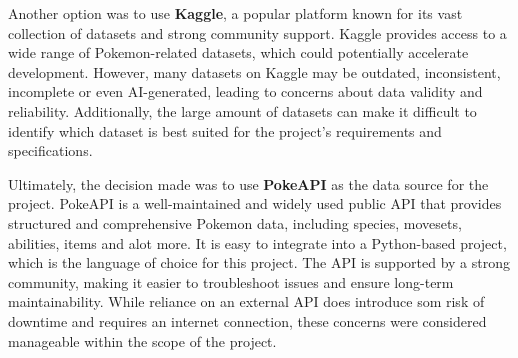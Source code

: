 Another option was to use \textbf{Kaggle}, a popular platform known for its vast collection
of datasets and strong community support. Kaggle provides access to a wide range of Pokemon-related
datasets, which could potentially accelerate development. However, many datasets on Kaggle
may be outdated, inconsistent, incomplete or even AI-generated, leading to concerns about data 
validity and reliability. Additionally, the large amount of datasets can make it difficult to 
identify which dataset is best suited for the project's requirements and specifications.

Ultimately, the decision made was to use \textbf{PokeAPI} as the data source for the project. PokeAPI
is a well-maintained and widely used public API that provides structured and comprehensive Pokemon data,
including species, movesets, abilities, items and alot more. It is easy to integrate into
a Python-based project, which is the language of choice for this project. The API is 
supported by a strong community, making it easier to troubleshoot issues and ensure long-term
maintainability. While reliance on an external API does introduce som risk of downtime and 
requires an internet connection, these concerns were considered manageable within the scope of the project.
